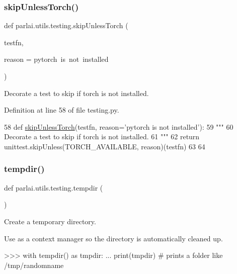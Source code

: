 \subsubsection{\texorpdfstring{skip\+Unless\+Torch()}{skipUnlessTorch()}}
{\footnotesize\ttfamily def parlai.\+utils.\+testing.\+skip\+Unless\+Torch (\begin{DoxyParamCaption}\item[{}]{testfn,  }\item[{}]{reason = {\ttfamily \textquotesingle{}pytorch~is~not~installed\textquotesingle{}} }\end{DoxyParamCaption})}

\begin{DoxyVerb}Decorate a test to skip if torch is not installed.
\end{DoxyVerb}
 

Definition at line 58 of file testing.\+py.


\begin{DoxyCode}
58 \textcolor{keyword}{def }\hyperlink{namespaceparlai_1_1utils_1_1testing_a7b182622aebc6cdc41ee3b99ebe47432}{skipUnlessTorch}(testfn, reason='pytorch is not installed'):
59     \textcolor{stringliteral}{"""}
60 \textcolor{stringliteral}{    Decorate a test to skip if torch is not installed.}
61 \textcolor{stringliteral}{    """}
62     \textcolor{keywordflow}{return} unittest.skipUnless(TORCH\_AVAILABLE, reason)(testfn)
63 
64 
\end{DoxyCode}
\mbox{\label{namespaceparlai_1_1utils_1_1testing_a0945b769a10c0c844b29c02ff26445a5}} 
\subsubsection{\texorpdfstring{tempdir()}{tempdir()}}
{\footnotesize\ttfamily def parlai.\+utils.\+testing.\+tempdir (\begin{DoxyParamCaption}{ }\end{DoxyParamCaption})}

\begin{DoxyVerb}Create a temporary directory.

Use as a context manager so the directory is automatically cleaned up.

>>> with tempdir() as tmpdir:
...    print(tmpdir)  # prints a folder like /tmp/randomname
\end{DoxyVerb}
 

